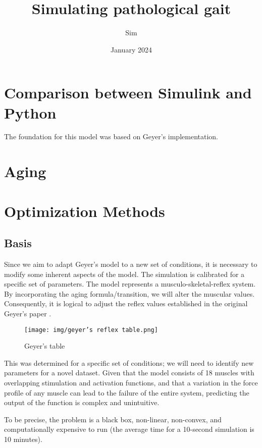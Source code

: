 \documentclass{article}
\title{Simulating pathological gait}
\author{Sim }
\date{January 2024}
\begin{document}
\maketitle

\tableofcontents
\newpage



\section{Comparison between Simulink and Python}

The foundation for this model was based on Geyer's implementation.
\section{Aging}

\section{Optimization Methods}
\subsection{Basis}
Since we aim to adapt Geyer's model to a new set of conditions, it is necessary to modify some inherent aspects of the model. The simulation is calibrated for a specific set of parameters. The model represents a musculo-skeletal-reflex system. By incorporating the aging formula/transition, we will alter the muscular values. Consequently, it is logical to adjust the reflex values established in the original Geyer's paper \cite{geyer2010muscle}.

\begin{figure}[ht]
  \centering
  \texttt{[image: img/geyer's reflex table.png]} %
  \caption{Geyer's table}
  \label{fig:Geyer's table}
\end{figure}

This was determined for a specific set of conditions; we will need to identify new parameters for a novel dataset. Given that the model consists of 18 muscles with overlapping stimulation and activation functions, and that a variation in the force profile of any muscle can lead to the failure of the entire system, predicting the output of the function is complex and unintuitive.

To be precise, the problem is a black box, non-linear, non-convex, and computationally expensive to run (the average time for a 10-second simulation is 10 minutes).
\end{document}
